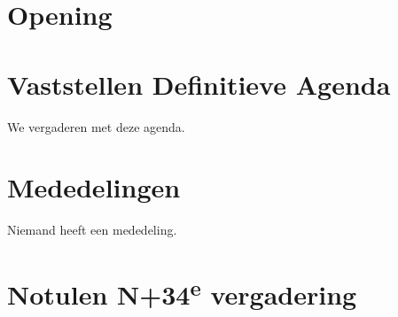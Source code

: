 \documentclass[
dutch
]{GEWISMinutes}
\begin{document}
	
	\section{Opening}
	
	\section{Vaststellen Definitieve Agenda}
	We vergaderen met deze agenda.
	
	\section{Mededelingen}
	Niemand heeft een mededeling.
	
	\section{\texorpdfstring{Notulen N+34\textsuperscript  {e} vergadering}{Notulen}}
	\approveMinutes
	
\end{document}
